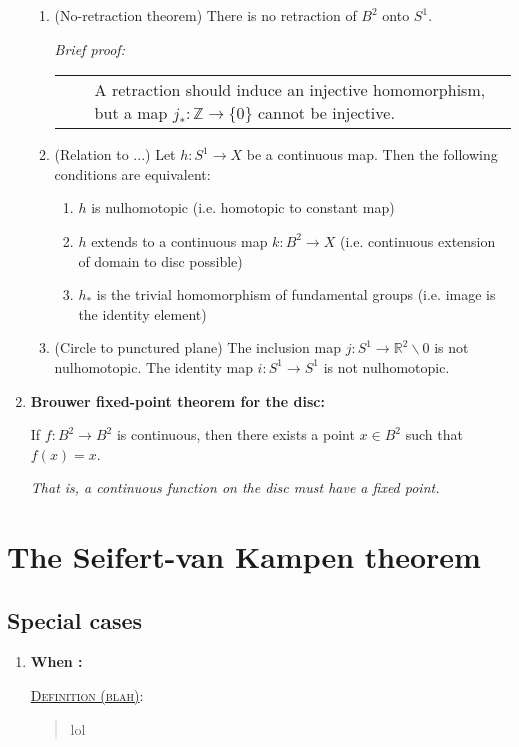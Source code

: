 \documentclass[letterpaper, 12pt]{book}
\newcommand{\RR}{\mathbb{R}}
\newcommand{\ZZ}{\mathbb{Z}}
\newcommand{\defn}[2]{\textsc{\underline{Definition (#1)}:}\begin{quote} #2\end{quote}}
\newenvironment{briefproof}{\footnotesize\begin{flushleft}\textit{Brief proof:}\par\begin{tabular}{l|p{0.8\textwidth}}$\quad$&}{\\
    \end{tabular}\end{flushleft}}
\begin{document}
\begin{enumerate}[resume]
\begin{enumerate}
        \item (No-retraction theorem) There is no retraction of $B^2$ onto $S^1$.
            \begin{briefproof}
            A retraction should induce an injective homomorphism, but a map $j_* : \ZZ \to \{0\}$ cannot be injective.
            \end{briefproof}
        \item (Relation to ...) Let $h:S^1\to X$ be a continuous map. Then the following conditions are equivalent: %
            \begin{enumerate}
            \item $h$ is nulhomotopic (i.e. homotopic to constant map)
            \item $h$ extends to a continuous map $k:B^2\to X$ (i.e. continuous extension of domain to disc possible)
            \item $h_*$ is the trivial homomorphism of fundamental groups (i.e. image is the identity element)
            \end{enumerate}
        \item (Circle to punctured plane) The inclusion map $j : S^1 \to \RR^2\smallsetminus 0$ is not nulhomotopic. The identity map $i:S^1\to S^1$ is not nulhomotopic.
        \end{enumerate}
    \item \textbf{Brouwer fixed-point theorem for the disc:}

        If $f:B^2\to B^2$ is continuous, then there exists a point $x\in B^2$ such that $f(x) = x$.

        \textit{That is, a continuous function on the disc must have a fixed point.}
    \end{enumerate}

\chapter{The Seifert-van Kampen theorem}
\section{Special cases}
    \begin{enumerate}[resume]
    \item \textbf{When :}

        \defn{blah}{lol}
    \end{enumerate}
\end{document}
